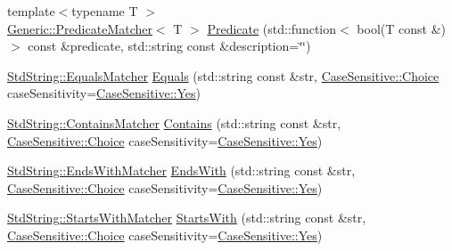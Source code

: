 \begin{DoxyCompactItemize}
{\footnotesize template$<$typename T $>$ }\\\mbox{\hyperlink{class_catch_1_1_matchers_1_1_generic_1_1_predicate_matcher}{Generic\+::\+Predicate\+Matcher}}$<$ T $>$ \mbox{\hyperlink{namespace_catch_1_1_matchers_a034f2de6c0aac6f4a662fdf2558aedce}{Predicate}} (std\+::function$<$ bool(T const \&)$>$ const \&predicate, std\+::string const \&description=\char`\"{}\char`\"{})
\item 
\mbox{\hyperlink{struct_catch_1_1_matchers_1_1_std_string_1_1_equals_matcher}{Std\+String\+::\+Equals\+Matcher}} \mbox{\hyperlink{namespace_catch_1_1_matchers_af8af7dfc338335ed4c788cb1b37fc59f}{Equals}} (std\+::string const \&str, \mbox{\hyperlink{struct_catch_1_1_case_sensitive_aad49d3aee2d97066642fffa919685c6a}{Case\+Sensitive\+::\+Choice}} case\+Sensitivity=\mbox{\hyperlink{struct_catch_1_1_case_sensitive_aad49d3aee2d97066642fffa919685c6aa7c5550b69ec3c502e6f609b67f9613c6}{Case\+Sensitive\+::\+Yes}})
\item 
\mbox{\hyperlink{struct_catch_1_1_matchers_1_1_std_string_1_1_contains_matcher}{Std\+String\+::\+Contains\+Matcher}} \mbox{\hyperlink{namespace_catch_1_1_matchers_a1f6c2accdc6cd75a84d7112dcad647b4}{Contains}} (std\+::string const \&str, \mbox{\hyperlink{struct_catch_1_1_case_sensitive_aad49d3aee2d97066642fffa919685c6a}{Case\+Sensitive\+::\+Choice}} case\+Sensitivity=\mbox{\hyperlink{struct_catch_1_1_case_sensitive_aad49d3aee2d97066642fffa919685c6aa7c5550b69ec3c502e6f609b67f9613c6}{Case\+Sensitive\+::\+Yes}})
\item 
\mbox{\hyperlink{struct_catch_1_1_matchers_1_1_std_string_1_1_ends_with_matcher}{Std\+String\+::\+Ends\+With\+Matcher}} \mbox{\hyperlink{namespace_catch_1_1_matchers_ae5a45efb4538c57c43e04f3f9043ad6e}{Ends\+With}} (std\+::string const \&str, \mbox{\hyperlink{struct_catch_1_1_case_sensitive_aad49d3aee2d97066642fffa919685c6a}{Case\+Sensitive\+::\+Choice}} case\+Sensitivity=\mbox{\hyperlink{struct_catch_1_1_case_sensitive_aad49d3aee2d97066642fffa919685c6aa7c5550b69ec3c502e6f609b67f9613c6}{Case\+Sensitive\+::\+Yes}})
\item 
\mbox{\hyperlink{struct_catch_1_1_matchers_1_1_std_string_1_1_starts_with_matcher}{Std\+String\+::\+Starts\+With\+Matcher}} \mbox{\hyperlink{namespace_catch_1_1_matchers_a97c9ee09a70378ca7e8c6f9f01b0d6d1}{Starts\+With}} (std\+::string const \&str, \mbox{\hyperlink{struct_catch_1_1_case_sensitive_aad49d3aee2d97066642fffa919685c6a}{Case\+Sensitive\+::\+Choice}} case\+Sensitivity=\mbox{\hyperlink{struct_catch_1_1_case_sensitive_aad49d3aee2d97066642fffa919685c6aa7c5550b69ec3c502e6f609b67f9613c6}{Case\+Sensitive\+::\+Yes}})

\end{DoxyCompactItemize}
